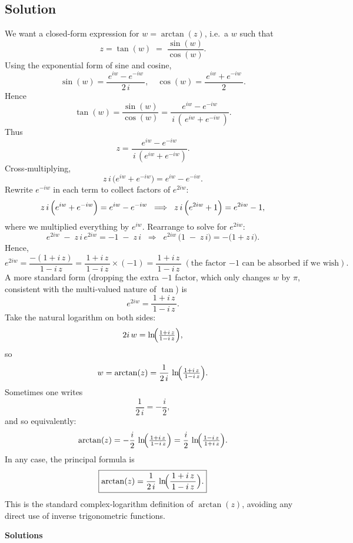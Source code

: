 \documentclass[12pt]{article}
\theoremstyle{definition} %
\theoremstyle{plain} %
\begin{document}
    \subsection*{Solution}
    We want a closed‐form expression for $w = \arctan(z)$, i.e.\ a $w$ such that
    \[
    z = \tan(w) \;=\; \frac{\sin(w)}{\cos(w)}.
    \]
    Using the exponential form of sine and cosine,
    \[
    \sin(w) = \frac{\,e^{i w} - e^{-i w}\,}{2\,i},
    \quad
    \cos(w) = \frac{\,e^{i w} + e^{-i w}\,}{2}.
    \]
    Hence
    \[
    \tan(w)
    = \frac{\sin(w)}{\cos(w)}
    = \frac{\,e^{i w} - e^{-i w}\,}{\,i\,(\,e^{i w} + e^{-i w}\,)}.
    \]
    Thus
    \[
    z = \frac{\,e^{i w} - e^{-i w}\,}{\,i\,(e^{i w} + e^{-i w})}.
    \]
    Cross‐multiplying,
    \[
    z\,i \,\bigl(e^{i w} + e^{-i w}\bigr)
    = e^{i w} - e^{-i w}.
    \]
    Rewrite $e^{-i w}$ in each term to collect factors of $e^{2 i w}$:
    \[
    z\,i \,\Bigl(e^{i w} + e^{-i w}\Bigr)
    = e^{i w} - e^{-i w}
    \;\;\Longrightarrow\;\;
    z\,i \,\Bigl(e^{2 i w} + 1\Bigr)
    = e^{2 i w} - 1,
    \]
    where we multiplied everything by $e^{i w}$.  Rearrange to solve for $e^{2 i w}$:
    \[
    e^{2 i w} \;-\; z\,i \,e^{2 i w}
    = -1 \;-\; z\,i
    \;\;\Longrightarrow\;\;
    e^{2 i w}\,\bigl(1 \;-\; z\,i\bigr)
    =  -\bigl(1 + z\,i\bigr).
    \]
    Hence,
    \[
    e^{2 i w} 
    = \frac{-(1 + i\,z)}{\,1 - i\,z\,}
    = \frac{\,1 + i\,z\,}{\,1 - i\,z\,} \times (-1)
    = \frac{\,1 + i\,z\,}{\,1 - i\,z\,} \;(\text{the factor $-1$ can be absorbed if we wish}).
    \]
    A more standard form (dropping the extra \(-1\) factor, which only changes $w$ by $\pi$, consistent with the multi‐valued nature of $\tan$) is
    \[
    e^{2 i w} 
    = \frac{1 + i\,z}{\,1 - i\,z\,}.
    \]
    Take the natural logarithm on both sides:
    \[
    2 i\,w = \ln\!\Bigl(\tfrac{1 + i\,z}{1 - i\,z}\Bigr),
    \]
    so
    \[
    w = \arctan(z)
    = \frac{1}{2\,i}\,\ln\!\Bigl(\tfrac{1 + i\,z}{\,1 - i\,z}\Bigr).
    \]
    Sometimes one writes
    \[
    \frac{1}{2\,i} = -\frac{i}{2},
    \]
    and so equivalently:
    \[
    \arctan(z) 
    = -\frac{i}{2}\,\ln\!\Bigl(\tfrac{1 + i\,z}{\,1 - i\,z}\Bigr)
    = \frac{i}{2}\,\ln\!\Bigl(\tfrac{1 - i\,z}{\,1 + i\,z}\Bigr).
    \]
    In any case, the principal formula is
    \[
    \boxed{\displaystyle
    \arctan(z)
    = \frac{1}{2\,i}\,\ln\!\Bigl(\frac{\,1 + i\,z\,}{\,1 - i\,z\,}\Bigr).
    }
    \]
    This is the standard complex‐logarithm definition of $\arctan(z)$, avoiding any direct use of inverse trigonometric functions.
    \begin{center}
        {\Large \textbf{Solutions}}
      \end{center}
      
\end{document}
